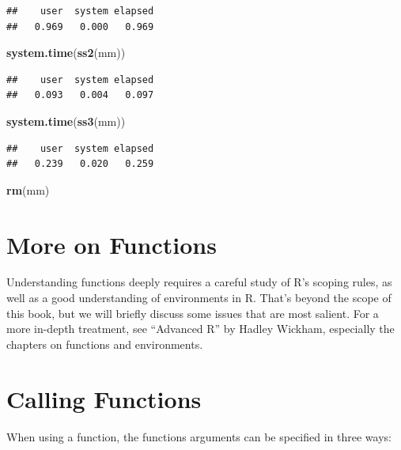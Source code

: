 \documentclass[
]{krantz}
\newenvironment{Shaded}{\begin{snugshade}}{\end{snugshade}}
\newcommand{\KeywordTok}[1]{\textcolor[rgb]{0.13,0.29,0.53}{\textbf{#1}}}
\newcommand{\NormalTok}[1]{#1}
\begin{document}
\begin{verbatim}
##    user  system elapsed 
##   0.969   0.000   0.969
\end{verbatim}

\begin{Shaded}
\begin{Highlighting}[]
\KeywordTok{system.time}\NormalTok{(}\KeywordTok{ss2}\NormalTok{(mm))}
\end{Highlighting}
\end{Shaded}

\begin{verbatim}
##    user  system elapsed 
##   0.093   0.004   0.097
\end{verbatim}

\begin{Shaded}
\begin{Highlighting}[]
\KeywordTok{system.time}\NormalTok{(}\KeywordTok{ss3}\NormalTok{(mm))}
\end{Highlighting}
\end{Shaded}

\begin{verbatim}
##    user  system elapsed 
##   0.239   0.020   0.259
\end{verbatim}

\begin{Shaded}
\begin{Highlighting}[]
\KeywordTok{rm}\NormalTok{(mm)}
\end{Highlighting}
\end{Shaded}

\hypertarget{more-on-functions}{%
\section{More on Functions}\label{more-on-functions}}

Understanding functions deeply requires a careful study of R's scoping rules, as well as a good understanding of environments in R. That's beyond the scope of this book, but we will briefly discuss some issues that are most salient. For a more in-depth treatment, see ``Advanced R'' by Hadley Wickham, especially the chapters on functions and environments.

\hypertarget{calling-functions}{%
\section{Calling Functions}\label{calling-functions}}

When using a function, the functions arguments can be specified in three ways:
\end{document}
